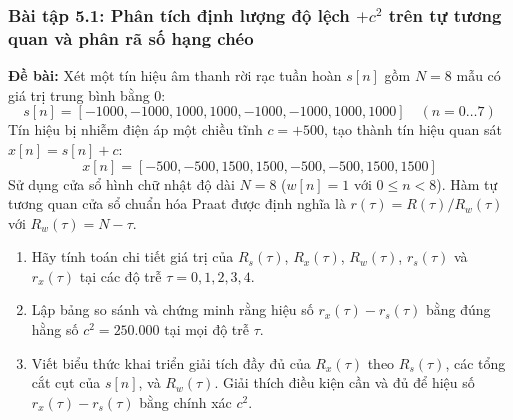 \subsubsection*{Bài tập 5.1: Phân tích định lượng độ lệch $+c^2$ trên tự tương quan và phân rã số hạng chéo}
\textbf{Đề bài:} Xét một tín hiệu âm thanh rời rạc tuần hoàn $s[n]$ gồm $N = 8$ mẫu có giá trị trung bình bằng $0$:
\begin{equation}
s[n] = [-1000, -1000, 1000, 1000, -1000, -1000, 1000, 1000] \quad (n = 0 \dots 7)
\end{equation}
Tín hiệu bị nhiễm điện áp một chiều tĩnh $c = +500$, tạo thành tín hiệu quan sát $x[n] = s[n] + c$:
\begin{equation}
x[n] = [-500, -500, 1500, 1500, -500, -500, 1500, 1500]
\end{equation}
Sử dụng cửa sổ hình chữ nhật độ dài $N = 8$ ($w[n] = 1$ với $0 \le n < 8$). Hàm tự tương quan cửa sổ chuẩn hóa Praat được định nghĩa là $r(\tau) = R(\tau) / R_w(\tau)$ với $R_w(\tau) = N - \tau$.
\begin{enumerate}[label=(\alph*)]
    \item Hãy tính toán chi tiết giá trị của $R_s(\tau)$, $R_x(\tau)$, $R_w(\tau)$, $r_s(\tau)$ và $r_x(\tau)$ tại các độ trễ $\tau = 0, 1, 2, 3, 4$.
    \item Lập bảng so sánh và chứng minh rằng hiệu số $r_x(\tau) - r_s(\tau)$ bằng đúng hằng số $c^2 = 250.000$ tại mọi độ trễ $\tau$.
    \item Viết biểu thức khai triển giải tích đầy đủ của $R_x(\tau)$ theo $R_s(\tau)$, các tổng cắt cụt của $s[n]$, và $R_w(\tau)$. Giải thích điều kiện cần và đủ để hiệu số $r_x(\tau) - r_s(\tau)$ bằng chính xác $c^2$.
\end{enumerate}

